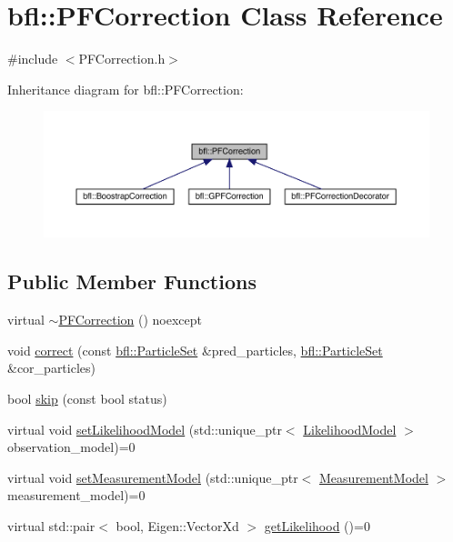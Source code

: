 \hypertarget{classbfl_1_1PFCorrection}{}\section{bfl\+:\+:P\+F\+Correction Class Reference}
\label{classbfl_1_1PFCorrection}


{\ttfamily \#include $<$P\+F\+Correction.\+h$>$}



Inheritance diagram for bfl\+:\+:P\+F\+Correction\+:
\nopagebreak
\begin{figure}[H]
\begin{center}
\leavevmode
\includegraphics[width=350pt]{classbfl_1_1PFCorrection__inherit__graph}
\end{center}
\end{figure}
\subsection*{Public Member Functions}
\begin{DoxyCompactItemize}
\item 
virtual \mbox{\hyperlink{classbfl_1_1PFCorrection_aa26f1c91715ebccc1d3c25f673d32279}{$\sim$\+P\+F\+Correction}} () noexcept
\item 
void \mbox{\hyperlink{classbfl_1_1PFCorrection_a560666b2e7566a846cb4ce4684e195e0}{correct}} (const \mbox{\hyperlink{classbfl_1_1ParticleSet}{bfl\+::\+Particle\+Set}} \&pred\+\_\+particles, \mbox{\hyperlink{classbfl_1_1ParticleSet}{bfl\+::\+Particle\+Set}} \&cor\+\_\+particles)
\item 
bool \mbox{\hyperlink{classbfl_1_1PFCorrection_ab25e625ea12fe257e0eb85d465835e62}{skip}} (const bool status)
\item 
virtual void \mbox{\hyperlink{classbfl_1_1PFCorrection_aa84e757c694d4ad375cdd543d42ac34c}{set\+Likelihood\+Model}} (std\+::unique\+\_\+ptr$<$ \mbox{\hyperlink{classbfl_1_1LikelihoodModel}{Likelihood\+Model}} $>$ observation\+\_\+model)=0
\item 
virtual void \mbox{\hyperlink{classbfl_1_1PFCorrection_a9844514568f65a0e5fa2cffadea460c6}{set\+Measurement\+Model}} (std\+::unique\+\_\+ptr$<$ \mbox{\hyperlink{classbfl_1_1MeasurementModel}{Measurement\+Model}} $>$ measurement\+\_\+model)=0
\item 
virtual std\+::pair$<$ bool, Eigen\+::\+Vector\+Xd $>$ \mbox{\hyperlink{classbfl_1_1PFCorrection_ab6eca766077c4ab1db3417dab6c44d27}{get\+Likelihood}} ()=0
\end{DoxyCompactItemize}
